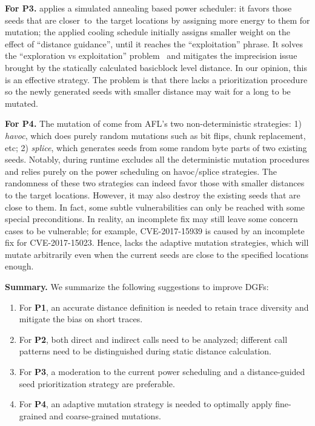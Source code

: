 \textbf{For P3. } 
\aflgo applies a simulated annealing based power scheduler: it favors those seeds that are closer~to~the target locations by assigning more energy to them for mutation; the applied cooling schedule initially assigns smaller weight on the effect of ``distance guidance'', until it reaches the ``exploitation'' phrase. It solves the ``exploration vs exploitation'' problem~\cite{eve} and mitigates the imprecision issue brought by the statically calculated basicblock level distance. In our opinion, this is an effective strategy. The problem is that there lacks a prioritization procedure so the newly generated seeds with smaller distance may wait for a long to be mutated.


 
\textbf{For P4. } The mutation of \aflgo come from AFL's two non-deterministic strategies: 1) \emph{havoc}, which does purely random mutations such as bit flips, chunk replacement, etc; 2) \emph{splice}, which generates seeds from some random byte parts of two existing seeds. 
Notably, during runtime \aflgo excludes all the deterministic mutation procedures and relies purely on the power scheduling on havoc/splice strategies.
The randomness of these two strategies can indeed favor those with smaller distances to the target locations.
However, it may also destroy the existing seeds that are close to them.
In fact, some subtle vulnerabilities can only be reached with some special preconditions. In reality, an incomplete fix may still leave some concern cases to be vulnerable; for example, CVE-2017-15939 is caused by an incomplete fix for CVE-2017-15023.
Hence, \aflgo lacks the adaptive mutation strategies, which will mutate arbitrarily even when the current seeds are close to the specified locations enough.


\textbf{Summary.} We summarize the following suggestions to improve DGFs:
\begin{enumerate}[(1)] 
	\itemsep0em
	\item For \textbf{P1}, an accurate distance definition is needed to retain trace diversity and mitigate the bias on short traces.
	\item For \textbf{P2}, both direct and indirect calls need to be analyzed; different call patterns need to be distinguished during static distance calculation.
	\item For \textbf{P3}, a moderation to the current power scheduling and a distance-guided seed prioritization strategy are preferable.
	\item For \textbf{P4}, an adaptive mutation strategy is needed to optimally apply fine-grained and coarse-grained mutations.
\end{enumerate}


